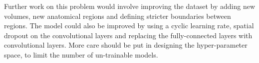 Further work on this problem would involve improving the dataset by adding new volumes, new anatomical regions and defining stricter boundaries between regions. The model could also be improved by using a cyclic learning rate, spatial dropout on the convolutional layers and replacing the fully-connected layers with convolutional layers. More care should be put in designing the hyper-parameter space, to limit the number of un-trainable models. 


